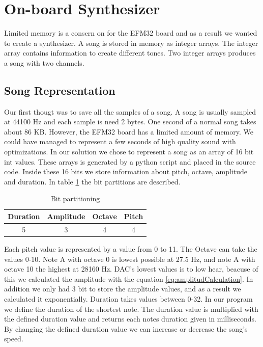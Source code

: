 \section{On-board Synthesizer}\label{sec:onboard-synthesizer}
Limited memory is a consern on for the EFM32 board and as a result we wanted to create a synthesizer. A song is stored in memory as integer arrays. The integer array contains information to create different tones. Two integer arrays produces a song with two channels.

\subsection{Song Representation}
Our first thougt was to save all the samples of a song. A song is usually sampled at 44100 Hz and each sample is need 2 bytes. One second of a normal song takes about 86 KB. However, the EFM32 board has a limited amount of memory. We could have managed to represent a few seconds of high quality sound with optimizations. In our solution we chose to represent a song as an array of 16 bit int values. These arrays is generated by a python script and placed in the source code. Inside these 16 bits we store information about pitch, octave, amplitude and duration. In table \ref{tab:bitFields} the bit partitions are described.

\begin{table}[H]
	\begin{center}
	\begin{tabular}{ |c|c|c|c| }
	  \hline
	  Duration & Amplitude & Octave & Pitch \\
	  \hline
	  5 & 3 & 4 & 4 \\
	  \hline

	\end{tabular}
	\caption{Bit partitioning}
	\label{tab:bitFields}
	\end{center}
\end{table}

Each pitch value is represented by a value from 0 to 11. The Octave can take the values 0-10. Note A with octave 0 is lowest possible at 27.5 Hz, and note A with octave 10 the highest at 28160 Hz. DAC's lowest values is to low hear, beacuse of this we calculated the amplitude with the equation \ref{eq:amplitudCalculation}. In addition we only had 3 bit to store the amplitude values, and as a result we calculated it exponentially. Duration takes values between 0-32. In our program we define the duration of the shortest note. The duration value is multiplied with the defined duration value and returns each notes duration given in milliseconds. By changing the defined duration value we can increase or decrease the song's speed.

